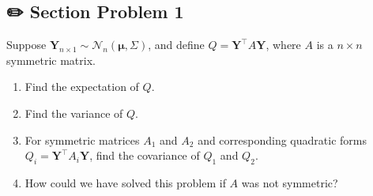 \documentclass[
  letterpaper,
  DIV=11,
  numbers=noendperiod]{scrreprt}
\theoremstyle{plain}
\theoremstyle{definition}
\theoremstyle{remark}
\begin{document}

\hypertarget{section-problem-1-5}{%
\subsection*{✏️ Section Problem 1}\label{section-problem-1-5}}

Suppose
\(\mathbf{Y}_{n\times 1}\sim \mathcal{N}_n(\mathbf{\mu},\Sigma)\), and
define \(Q=\mathbf{Y}^{\top}A\mathbf{Y}\), where \(A\) is a
\(n \times n\) symmetric matrix.

\begin{enumerate}
\def\labelenumi{(\alph{enumi})}
\item
  Find the expectation of \(Q\).
\item
  Find the variance of \(Q\).
\item
  For symmetric matrices \(A_{1}\) and \(A_{2}\) and corresponding
  quadratic forms \(Q_{i}=\mathbf{Y}^{\top}A_{i}\mathbf{Y}\), find the
  covariance of \(Q_{1}\) and \(Q_{2}\).
\item
  How could we have solved this problem if \(A\) was not symmetric?
\end{enumerate}
\end{document}
